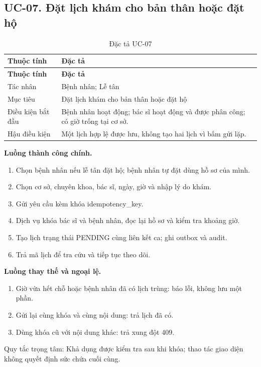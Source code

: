 \clearpage

\subsection{UC-07.\allowbreak{} Đặt lịch khám cho bản thân hoặc đặt hộ}
\label{uc:7}

{\small\setlength{\tabcolsep}{3pt}\renewcommand{\arraystretch}{1.12}
\begin{longtable}{@{}L{\textwidth-1.32pt\relax} L{\textwidth-4.68pt\relax}@{}}
\caption{Đặc tả UC-07}\\
\toprule
\textbf{Thuộc tính} & \textbf{Đặc tả}\\\midrule
\endfirsthead
\toprule
\textbf{Thuộc tính} & \textbf{Đặc tả}\\\midrule
\endhead
\bottomrule\endlastfoot
Tác nhân & Bệnh nhân; Lễ tân\\[3pt]
Mục tiêu & Đặt lịch khám cho bản thân hoặc đặt hộ\\[3pt]
Điều kiện bắt đầu & Bệnh nhân hoạt động; bác sĩ hoạt động và được phân công; có giờ trống tại cơ sở.\allowbreak{}\\[3pt]
Hậu điều kiện & Một lịch hợp lệ được lưu, không tạo hai lịch vì bấm gửi lặp.\allowbreak{}\\[3pt]
\end{longtable}}
\noindent\textbf{Luồng thành công chính.}
\begin{enumerate}
\item Chọn bệnh nhân nếu lễ tân đặt hộ; bệnh nhân tự đặt dùng hồ sơ của mình.\allowbreak{}
\item Chọn cơ sở, chuyên khoa, bác sĩ, ngày, giờ và nhập lý do khám.\allowbreak{}
\item Gửi yêu cầu kèm khóa idempotency\_\allowbreak{}key.\allowbreak{}
\item Dịch vụ khóa bác sĩ và bệnh nhân, đọc lại hồ sơ và kiểm tra khoảng giờ.\allowbreak{}
\item Tạo lịch trạng thái PENDING cùng liên kết ca; ghi outbox và audit.\allowbreak{}
\item Trả mã lịch để tra cứu và tiếp tục theo dõi.\allowbreak{}
\end{enumerate}
\noindent\textbf{Luồng thay thế và ngoại lệ.}
\begin{enumerate}
\item Giờ vừa hết chỗ hoặc bệnh nhân đã có lịch trùng:\allowbreak{} báo lỗi, không lưu một phần.\allowbreak{}
\item Gửi lại cùng khóa và cùng nội dung:\allowbreak{} trả lịch đã có.\allowbreak{}
\item Dùng khóa cũ với nội dung khác:\allowbreak{} trả xung đột 409.\allowbreak{}
\end{enumerate}
Quy tắc trọng tâm:\allowbreak{} Khả dụng được kiểm tra sau khi khóa; thao tác giao diện không quyết định sức chứa cuối cùng.\allowbreak{}

